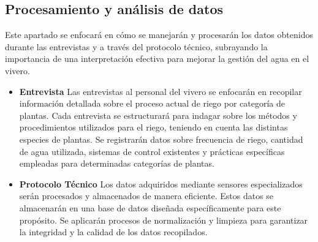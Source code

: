 \subsection{Procesamiento y análisis de datos}
Este apartado se enfocará en cómo se manejarán y procesarán los datos obtenidos
durante las entrevistas y a través del protocolo técnico, subrayando la
importancia de una interpretación efectiva para mejorar la gestión del agua en
el vivero.

\begin{itemize}
        \bigbreak 
        \item \textbf{Entrevista}
                \bigbreak
                Las entrevistas al personal del vivero se enfocarán en recopilar información detallada sobre el proceso actual de riego por categoría de plantas. Cada entrevista se estructurará para indagar sobre los métodos y procedimientos utilizados para el riego, teniendo en cuenta las distintas especies de plantas. Se registrarán datos sobre frecuencia de riego, cantidad de agua utilizada, sistemas de control existentes y prácticas específicas empleadas para determinadas categorías de plantas.

        \item \textbf{Protocolo Técnico}
                \bigbreak
                Los datos adquiridos mediante sensores especializados serán procesados y almacenados de manera eficiente. Estos datos se almacenarán en una base de datos diseñada específicamente para este propósito. Se aplicarán procesos de normalización y limpieza para garantizar la integridad y la calidad de los datos recopilados.

\end{itemize}


